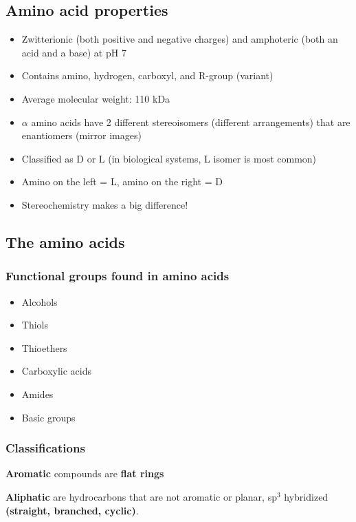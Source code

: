 \documentclass[letterpaper, 12pt]{article}
\begin{document}
\subsection*{Amino acid properties}
\begin{itemize}
\item Zwitterionic (both positive and negative charges) and amphoteric (both an acid and a base) at pH 7
\item Contains amino, hydrogen, carboxyl, and R-group (variant)
\item Average molecular weight: 110 kDa
\item $\alpha$ amino acids have 2 different stereoisomers (different arrangements) that are enantiomers (mirror images)
\item Classified as D or L (in biological systems, L isomer is most common)
\item Amino on the left = L, amino on the right = D
\item Stereochemistry makes a big difference!
\end{itemize}

\subsection*{The amino acids}

\subsubsection*{Functional groups found in amino acids}

\begin{itemize}
\item Alcohols
\item Thiols
\item Thioethers
\item Carboxylic acids
\item Amides
\item Basic groups
\end{itemize}

\subsubsection*{Classifications}

\textbf{Aromatic} compounds are \textbf{flat rings}

\textbf{Aliphatic} are hydrocarbons that are not aromatic or planar, sp$^3$ hybridized \textbf{(straight, branched, cyclic)}.
\end{document}
